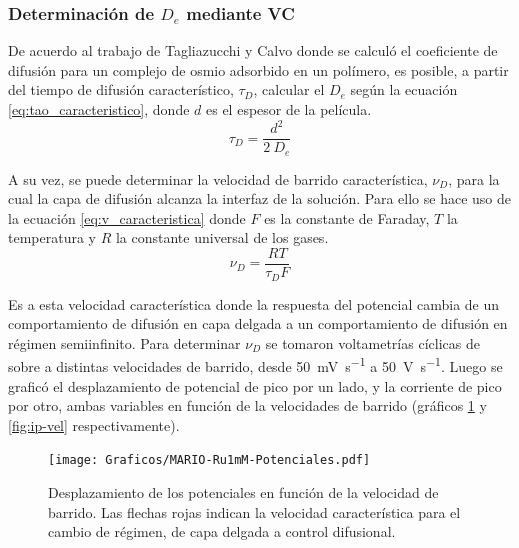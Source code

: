 	 \subsubsection*{Determinación de $D_e$ mediante VC}	
	 
	   	 De acuerdo al trabajo de Tagliazucchi y Calvo\cite{Tagliazucchi2010a} donde se calculó el coeficiente de difusión para un complejo de osmio adsorbido en un polímero, es posible, a partir del tiempo de difusión característico, $\tau_{\scriptscriptstyle{D}}$, calcular el $D_e$ según la ecuación \ref{eq:tao_caracteristico}, donde $d$ es el espesor de la película. 
	   		\begin{equation}
					\tau_{\scriptscriptstyle{D}}=\frac{d^2}{2\ D_e}
					\label{eq:tao_caracteristico}
			 \end{equation} 
  	  	  
  	  	  A su vez, se puede determinar la  velocidad de barrido característica, $\nu_{\scriptscriptstyle{D}}$, para la cual la capa de difusión alcanza la interfaz de la solución. Para ello se hace uso de la ecuación \ref{eq:v_caracteristica} donde $F$ es la constante de Faraday, $T$ la temperatura y $R$ la constante universal de los gases.
	  	   	 \begin{equation}
					\nu_{\scriptscriptstyle{D}}=\frac{RT}{\tau_{\scriptscriptstyle{D}}F}
					\label{eq:v_caracteristica}
			 \end{equation}
	     
	      Es a esta velocidad característica donde la respuesta del potencial cambia de un comportamiento de difusión en capa delgada a un comportamiento de difusión en régimen semiinfinito. Para determinar $\nu_{\scriptscriptstyle{D}}$ se tomaron voltametrías cíclicas de \ru\space sobre \pdmF\space a distintas velocidades de barrido, desde \SI{50}{\milli\volt\per\second} a \SI{50}{\volt\per\second}. Luego se graficó el desplazamiento de potencial de pico por un lado, y la corriente de pico por otro, ambas variables en función de la velocidades de barrido (gráficos \ref{fig:corrimiento-potenciales} y \ref{fig:ip-vel} respectivamente).
	   			
			 \begin{figure}[b!]
					\centering
			 	    \texttt{[image: Graficos/MARIO-Ru1mM-Potenciales.pdf]}
			        \caption[Desplazamiento de potenciales]{Desplazamiento de los potenciales en función de la velocidad de barrido. Las flechas rojas indican la velocidad característica para el cambio de régimen, de capa delgada a control difusional.}
			        \label{fig:corrimiento-potenciales}
			      	\end{figure}
           
